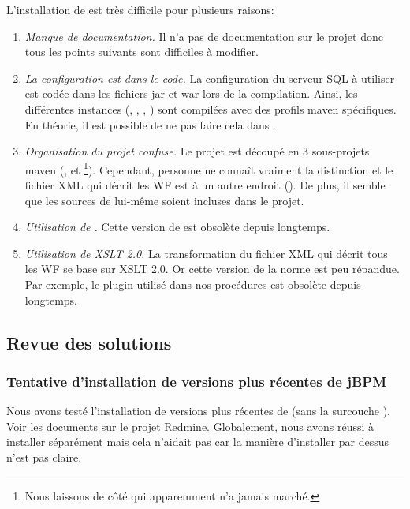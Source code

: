 L'installation de  est très difficile pour plusieurs raisons:
\begin{enumerate}
    \item \emph{Manque de documentation.} Il n'a pas de documentation sur le projet donc tous les points suivants sont difficiles à modifier.
    \item \emph{La configuration est dans le code.} La configuration du serveur SQL à utiliser est codée dans les fichiers jar et war lors de la compilation.
           Ainsi, les différentes instances (, , , ) sont compilées avec des profils maven spécifiques.
           En théorie, il est possible de ne pas faire cela dans .
    \item \emph{Organisation du projet confuse.} Le projet est découpé en 3 sous-projets maven (,  et \footnote{Nous laissons de côté  qui apparemment n'a jamais marché.}).
          Cependant, personne ne connaît vraiment la distinction et le fichier XML qui décrit les WF est à un autre endroit ().
          De plus, il semble que les sources de  lui-même soient incluses dans le projet.
    \item \emph{Utilisation de .} Cette version de  est obsolète depuis longtemps.
    \item \emph{Utilisation de XSLT 2.0.} La transformation du fichier XML qui décrit tous les WF se base sur XSLT 2.0.
          Or cette version de la norme est peu répandue.
          Par exemple, le plugin  utilisé dans nos procédures est obsolète depuis longtemps.
\end{enumerate}

\subsection{Revue des solutions}

\subsubsection{Tentative d'installation de versions plus récentes de jBPM}

Nous avons testé l'installation de versions plus récentes de  (sans la surcouche ).
Voir \href{https://intranet.genoscope.cns.fr/agc/redmine/documents/88}{les documents sur le projet Redmine}.
Globalement, nous avons réussi à installer  séparément mais cela n'aidait pas
car la manière d'installer  par dessus n'est pas claire.

